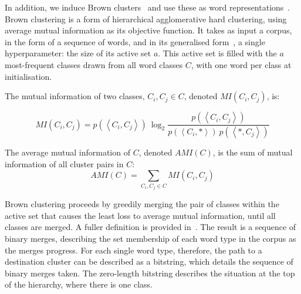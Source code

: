 \documentclass[10pt,journal,compsoc]{IEEEtran}
\begin{document}
In addition, we induce Brown clusters~\cite{brown1992class} and use these as word representations~\cite{turian2009preliminary}.
Brown clustering is a form of hierarchical agglomerative hard clustering, using average mutual information as its objective function.
It takes as input a corpus, in the form of a sequence of words, and in its generalised form~\cite{derczynski2016generalised}, a single hyperparameter: the size of its active set $a$.
This active set is filled with the $a$ most-frequent classes drawn from all word classes $C$, with one word per class at initialisation.

The mutual information of two classes, $C_i,C_j\in C$, denoted $MI(C_i,C_j)$, is:

\begin{equation}
MI(C_i,C_j)=
p(\left<C_i,C_j\right>)\ \log_2{\frac{p(\left<C_i,C_j\right>)}{p(\left<C_i,*\right>)\ p(\left<*,C_j\right>)}}
\end{equation}

The average mutual information of $C$, denoted $AMI(C)$, is the sum of mutual information of all cluster pairs in $C$:
\begin{equation}
AMI(C) = \sum_{C_i,C_j\in C}{MI(C_i,C_j)}
\end{equation}

Brown clustering proceeds by greedily merging the pair of classes within the active set that causes the least loss to average mutual information, until all classes are merged.
A fuller definition is provided in~\cite{derczynski2016generalised}.
The result is a sequence of binary merges, describing the set membership of each word type in the corpus as the merges progress.
For each single word type, therefore, the path to a destination cluster can be described as a bitstring, which details the sequence of binary merges taken.
The zero-length bitstring describes the situation at the top of the hierarchy, where there is one class.
\end{document}
